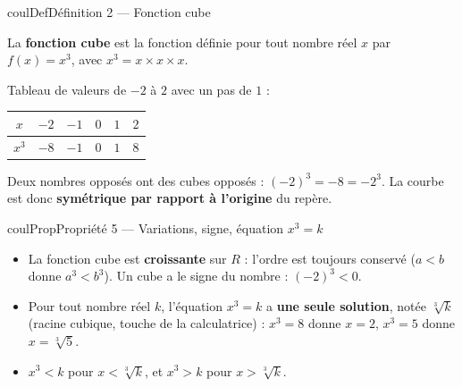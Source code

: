 \documentclass[11pt,a4paper]{article}
\makeatletter
\newcommand{\R}{\mathbb{R}}
\newcommand{\N}{\mathbb{N}}
\newcommand{\Z}{\mathbb{Z}}
\newcommand{\Q}{\mathbb{Q}}
\newcommand{\vect}[1]{\overrightarrow{#1}}
\newcommand{\fois}[1]{\times{\color{coulExo}#1}}
\newcommand{\lycee@repere}[4]{%
  \draw[grille,step=1] (#1,#2) grid (#3,#4);
  \draw[-{Stealth[length=2mm]},thick] (#1,0)--({#3+0.4},0) node[below left=-1pt]{$x$};
  \draw[-{Stealth[length=2mm]},thick] (0,#2)--(0,{#4+0.4}) node[below left=-1pt]{$y$};
  \node[below left,font=\scriptsize,inner sep=1.5pt] at (0,0) {$0$};}
\newcommand{\lycee@gradx}[1]{\foreach \k/\l in {#1}{%
  \draw (\k,0.07)--(\k,-0.07) node[below,font=\scriptsize,inner sep=1.5pt]{$\l$};}}
\newcommand{\lycee@grady}[1]{\foreach \k/\l in {#1}{%
  \draw (0.07,\k)--(-0.07,\k) node[left,font=\scriptsize,inner sep=1.5pt]{$\l$};}}
\providecommand{\repere}{\lycee@repere}%
\providecommand{\gradx}{\lycee@gradx}%
\providecommand{\grady}{\lycee@grady}%
\providecommand{\Cf}{\mathcal{C}\sb{f}}%
\providecommand{\Cg}{\mathcal{C}\sb{g}}%
\newcounter{lycee@signet}
\newcommand{\signet}[3][]{\stepcounter{lycee@signet}%
  \edef\lycee@dest{\if\relax\detokenize{#1}\relax
    signet.\arabic{lycee@signet}\else#1\fi}%
  \hypertarget{\lycee@dest}{}\bookmark[level=#2,dest=\lycee@dest]{#3}}
\def\R{R}\def\N{N}\def\Z{Z}\def\Q{Q}\def\vect#1{#1}\def\Cf{Cf}\def\Cg{Cg}\def\fois#1{×#1}%
\newenvironment{definitionbox}[1][Définition]%
  {\begin{boitecours}[phantom={\signet{2}{#1}}]{coulDef}{#1}}{\end{boitecours}}
\newenvironment{proprietebox}[1][Propriété]%
  {\begin{boitecours}[phantom={\signet{2}{#1}}]{coulProp}{#1}}{\end{boitecours}}
\makeatother
\begin{document}
\begin{definitionbox}[Définition 2 --- Fonction cube]
\begin{minipage}[c]{0.62\linewidth}\raggedright
La \textbf{fonction cube} est la fonction définie pour tout nombre réel $x$ par
${f(x)=x^{3}}$, avec $x^{3}=x\times x\times x$.

\smallskip
Tableau de valeurs de $-2$ à $2$ avec un pas de $1$ :
\begin{center}
\renewcommand{\arraystretch}{1.25}
\begin{tabular}{|c|*{5}{c|}}
\hline
$x$ & $-2$ & $-1$ & $0$ & $1$ & $2$\\\hline
$x^{3}$ & $-8$ & $-1$ & $0$ & $1$ & $8$\\\hline
\end{tabular}
\end{center}
Deux nombres opposés ont des cubes opposés : $(-2)^{3}=-8=-2^{3}$. La courbe est donc
\textbf{symétrique par rapport à l'origine} du repère.
\end{minipage}\hfill
\begin{minipage}[c]{0.34\linewidth}\centering
{}
\end{minipage}
\end{definitionbox}

\begin{proprietebox}[Propriété 5 --- Variations, signe, équation $x^{3}=k$]
\begin{itemize}
  \item La fonction cube est \textbf{croissante} sur $\R$ : l'ordre est toujours conservé
        ($a<b$ donne $a^{3}<b^{3}$). Un cube a le signe du nombre : $(-2)^{3}<0$.
  \item Pour tout nombre réel $k$, l'équation $x^{3}=k$ a \textbf{une seule solution}, notée
        $\sqrt[3]{k}$ (racine cubique, touche de la calculatrice) : $x^{3}=8$ donne $x=2$,
        $x^{3}=5$ donne $x=\sqrt[3]{5}$.
  \item $x^{3}<k$ pour $x<\sqrt[3]{k}$, et $x^{3}>k$ pour $x>\sqrt[3]{k}$.
\end{itemize}
\end{proprietebox}
\end{document}
